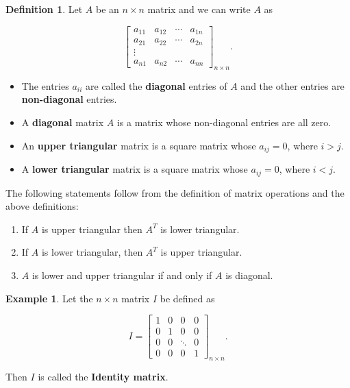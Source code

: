 \documentclass[12pt]{article}
\theoremstyle{definition}
\newtheorem*{definition}{Definition}
\newtheorem*{example}{Example}
\begin{document}
\begin{definition}
Let $A$ be an $n \times n$ matrix and we can write $A$ as

\[
\begin{bmatrix}
a_{11} & a_{12} & \cdots & a_{1n} \\
a_{21} & a_{22} & \cdots & a_{2n} \\
\vdots & & & \\
a_{n1} & a_{n2} & \cdots & a_{nn}
\end{bmatrix}_{n \times n}.
\]


\begin{itemize}[label= ]
\item The entries $a_{ii}$ are called the \textbf{diagonal} entries of $A$ and the other
entries are \textbf{non-diagonal} entries.
 
\item A \textbf{diagonal} matrix $A$ is a matrix whose non-diagonal entries are all zero.

\item An \textbf{upper triangular} matrix is a square matrix whose $a_{ij} = 0$, where $i > j$. 

\item A \textbf{lower triangular} matrix is a square matrix whose $a_{ij} = 0$, where $i < j$.
\end{itemize}

\end{definition}

The following statements follow from the definition of matrix operations and the above 
definitions:

\begin{enumerate}
\item If $A$ is upper triangular then $A^T$ is lower triangular.
\item If $A$ is lower triangular, then $A^T$ is upper triangular.
\item $A$ is lower and upper triangular if and only if $A$ is diagonal.
\end{enumerate}

\begin{example}
Let the $n \times n$ matrix $I$ be defined as

\[
I =
\begin{bmatrix}
1 & 0 & 0 & 0\\
0 & 1 & 0 & 0\\
0 & 0 & \ddots & 0 \\
0& 0 & 0 & 1
\end{bmatrix}_{n \times n}.
\]

Then $I$ is called the \textbf{Identity matrix}.
\end{example}
\end{document}
